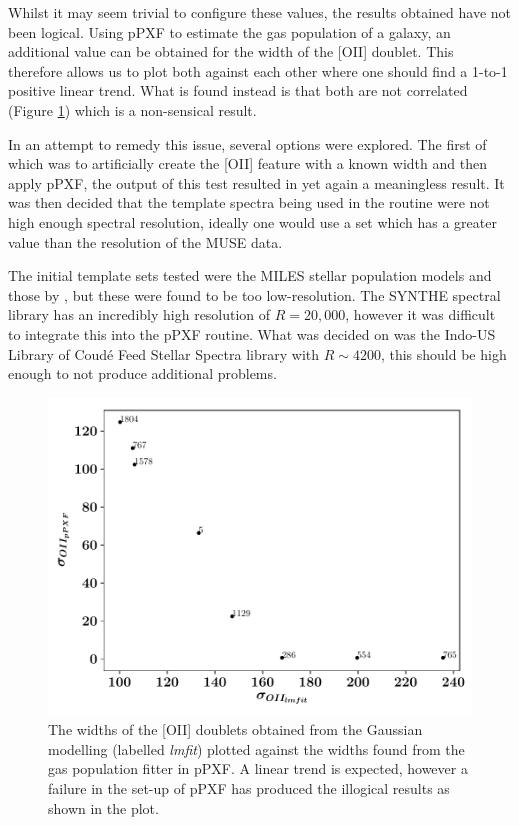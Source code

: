 \documentclass[12pt, twocolumn]{revtex4-1}    %
\begin{document}
Whilst it may seem trivial to configure these values, the results obtained have not been logical. Using pPXF to estimate the gas population of a galaxy, an additional value can be obtained for the width of the [OII] doublet. This therefore allows us to plot both against each other where one should find a 1-to-1 positive linear trend. What is found instead is that both are not correlated (Figure \ref{fig:oii_widths}) which is a non-sensical result. 

In an attempt to remedy this issue, several options were explored. The first of which was to artificially create the [OII] feature with a known width and then apply pPXF, the output of this test resulted in yet again a meaningless result. It was then decided that the template spectra being used in the routine were not high enough spectral resolution, ideally one would use a set which has a greater value than the resolution of the MUSE data. 


The initial template sets tested were the MILES stellar population models \citep{vazdekis_miles} and those by \cite{jacoby_spectra}, but these were found to be too low-resolution. The SYNTHE spectral library \citep{munari_synthe} has an incredibly high resolution of $R=20,000$, however it was difficult to integrate this into the pPXF routine. What was decided on was the Indo-US Library of Coud{\'e} Feed Stellar Spectra \citep{valdes_coude} library with $R\sim4200$, this should be high enough to not produce additional problems.

\begin{figure}
\includegraphics[width=1.0\linewidth]{data/oii_ppxf_vs_oii_lmfit}
\caption{The widths of the [OII] doublets obtained from the Gaussian modelling (labelled \textit{lmfit}) plotted against the widths found from the gas population fitter in pPXF. A linear trend is expected, however a failure in the set-up of pPXF has produced the illogical results as shown in the plot.}
\label{fig:oii_widths}
\end{figure}
\end{document}

